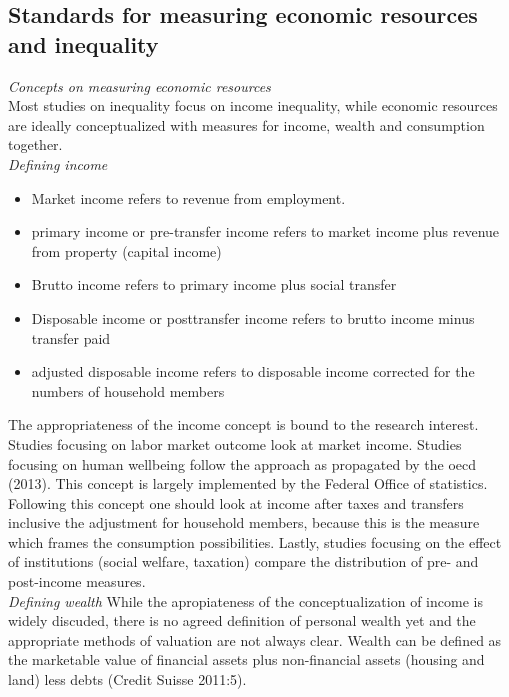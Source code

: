 \documentclass[twoside]{article}\usepackage[]{graphicx}\usepackage[]{color}
\begin{document}
\begin{multicols}{2}
\subsection{Standards for measuring economic resources and inequality}

\emph{Concepts on measuring economic resources}  \\
Most studies on inequality focus on income inequality, while economic resources are ideally conceptualized with measures for income, wealth and consumption together. \\


\emph{Defining income}

\begin{itemize}
\item Market income refers to revenue from employment.
\item primary income or pre-transfer income refers to  market income plus revenue from property (capital income)
\item Brutto income refers to  primary income plus social transfer
\item Disposable income or posttransfer income refers to  brutto income minus transfer paid 
\item adjusted disposable income refers to  disposable income corrected for the numbers of household members 
\end{itemize}

The appropriateness of the income concept is bound to the research interest. Studies focusing on labor market outcome look at market income. Studies focusing on human wellbeing follow the approach as propagated by the oecd (2013). This concept is largely implemented by the Federal Office of statistics. Following this concept one should look at income after taxes and transfers inclusive the adjustment for household members, because this is the measure which frames the consumption possibilities. Lastly, studies focusing on the effect of institutions (social welfare, taxation) compare the distribution of pre- and post-income measures. \\   

\emph{Defining wealth}
While the apropiateness of the conceptualization of income is widely discuded, there is no agreed definition of personal wealth yet and the appropriate methods of valuation are not always clear. 
Wealth can be defined as the marketable value of financial assets plus non-financial assets (housing and land) less debts (Credit Suisse 2011:5).


\end{multicols}
\end{document}
